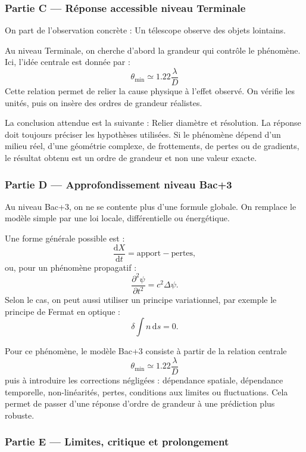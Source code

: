 \documentclass[11pt,a4paper]{article}
\begin{document}
\subsubsection*{Partie C — Réponse accessible niveau Terminale}

\begin{corrigebox}
On part de l'observation concrète : Un télescope observe des objets lointains.

Au niveau Terminale, on cherche d'abord la grandeur qui contrôle le phénomène. Ici, l'idée centrale est donnée par :
\[
\theta_{\min}\simeq1.22\frac{\lambda}{D}
\]
Cette relation permet de relier la cause physique à l'effet observé. On vérifie les unités, puis on insère des ordres de grandeur réalistes.

La conclusion attendue est la suivante : Relier diamètre et résolution. La réponse doit toujours préciser les hypothèses utilisées. Si le phénomène dépend d'un milieu réel, d'une géométrie complexe, de frottements, de pertes ou de gradients, le résultat obtenu est un ordre de grandeur et non une valeur exacte.
\end{corrigebox}

\subsubsection*{Partie D — Approfondissement niveau Bac+3}

\begin{approfondissementbox}
Au niveau Bac+3, on ne se contente plus d'une formule globale. On remplace le modèle simple par une loi locale, différentielle ou énergétique.

Une forme générale possible est :
\[
\frac{\mathrm d X}{\mathrm dt}=\text{apport}-\text{pertes},
\]
ou, pour un phénomène propagatif :
\[
\frac{\partial^2 \psi}{\partial t^2}=c^2\Delta\psi.
\]
Selon le cas, on peut aussi utiliser un principe variationnel, par exemple le principe de Fermat en optique :
\[
\delta \int n\,\mathrm ds=0.
\]

Pour ce phénomène, le modèle Bac+3 consiste à partir de la relation centrale
\[
\theta_{\min}\simeq1.22\frac{\lambda}{D}
\]
puis à introduire les corrections négligées : dépendance spatiale, dépendance temporelle, non-linéarités, pertes, conditions aux limites ou fluctuations. Cela permet de passer d'une réponse d'ordre de grandeur à une prédiction plus robuste.
\end{approfondissementbox}

\subsubsection*{Partie E — Limites, critique et prolongement}
\end{document}
